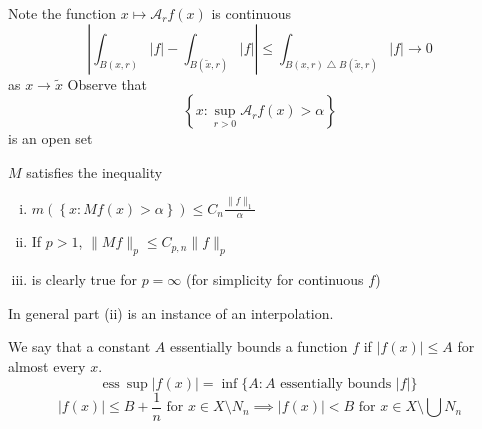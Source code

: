 \begin{remark}
  Note the function
  $x \mapsto \mathcal{A}_r f(x)$ is continuous
  \[\left|\int_{B(x, r)} |f| - \int_{B(\widetilde{x}, r)} |f| \right| \le \int_{B(x, r) \bigtriangleup B(\widetilde{x}, r)} |f| \to 0\]
  as $x \to \widetilde{x}$
  Observe that
  \[\left\{x : \sup_{r > 0} \mathcal{A}_r f(x) > \alpha\right\}\]
  is an open set
\end{remark}

\begin{theorem}
  $M$ satisfies the inequality
  \begin{enumerate}[(i)]
    \item $m\left(\left\{x : M f(x) > \alpha\right\}\right) \le C_n \frac{\|f\|_1}{\alpha}$
    \item If $p > 1$, $\|Mf\|_p \le C_{p, n} \|f\|_p$
    \item is clearly true for $p = \infty$ (for simplicity for continuous $f$)
  \end{enumerate}
  In general part (ii) is an instance of an interpolation.
\end{theorem}

We say that a constant $A$ essentially bounds a function $f$ if 
$|f(x)| \le A$ for almost every $x$.
\[\mathrm{ess}\ \sup |f(x)| = \inf \{A : A \text{ essentially bounds } |f|\}\]
\[|f(x)| \le B + \frac1n \text{ for } x\in X \setminus N_n \implies |f(x)| < B \text{ for } x \in X \setminus \bigcup N_n\]
